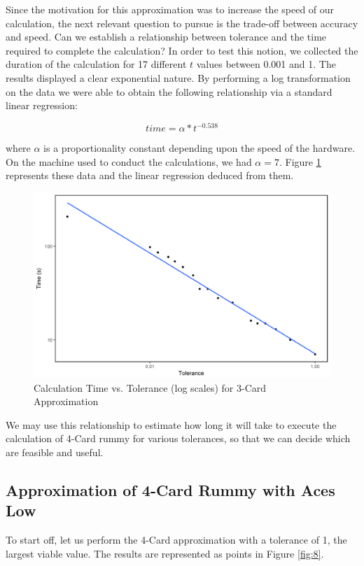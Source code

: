 \documentclass[letter,12pt]{article}
\begin{document}
Since the motivation for this approximation was to increase the speed of our calculation, the next relevant question to pursue is the trade-off between accuracy and speed. Can we establish a relationship between tolerance and the time required to complete the calculation? In order to test this notion, we collected the duration of the calculation for 17 different $t$ values between 0.001 and 1. The results displayed a clear exponential nature. By performing a log transformation on the data we were able to obtain the following relationship via a standard linear regression:

$$time = \alpha * t^{-0.538}$$

where $\alpha$ is a proportionality constant depending upon the speed of the hardware. On the machine used to conduct the calculations, we had $\alpha = 7$. Figure \ref{fig:7} represents these data and the linear regression deduced from them.

\begin{figure}
\includegraphics[width=\textwidth]{fig7.png}
\caption{Calculation Time vs. Tolerance (log scales) for 3-Card Approximation}\label{fig:7}
\end{figure}


We may use this relationship to estimate how long it will take to execute the calculation of 4-Card rummy for various tolerances, so that we can decide which are feasible and useful.

\subsection{Approximation of 4-Card Rummy with Aces Low}

To start off, let us perform the 4-Card approximation with a tolerance of 1, the largest viable value. The results are represented as points in Figure \ref{fig:8}.
\end{document}
